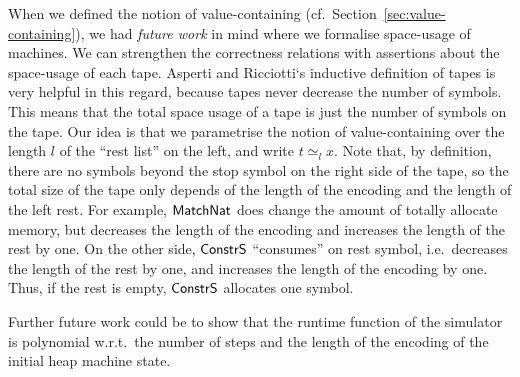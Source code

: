 When we defined the notion of value-containing (cf.\ Section~\ref{sec:value-containing}), we had \emph{future work} in mind where we formalise
space-usage of machines.  We can strengthen the correctness relations with assertions about the space-usage of each tape.  Asperti and Ricciotti`s
inductive definition of tapes is very helpful in this regard, because tapes never decrease the number of symbols.  This means that the total space
usage of a tape is just the number of symbols on the tape.  Our idea is that we parametrise the notion of value-containing over the length $l$ of the
``rest list'' on the left, and write $t \simeq_{l} x$.  Note that, by definition, there are no symbols beyond the stop symbol on the right side of the
tape, so the total size of the tape only depends of the length of the encoding and the length of the left rest.  For example, $\mathsf{MatchNat}$ does
change the amount of totally allocate memory, but decreases the length of the encoding and increases the length of the rest by one.  On the other
side, $\mathsf{ConstrS}$ ``consumes'' on rest symbol, i.e.\ decreases the length of the rest by one, and increases the length of the encoding by one.
Thus, if the rest is empty, $\mathsf{ConstrS}$ allocates one symbol.

Further future work could be to show that the runtime function of the simulator is polynomial w.r.t.\ the number of steps and the length of the
encoding of the initial heap machine state.


